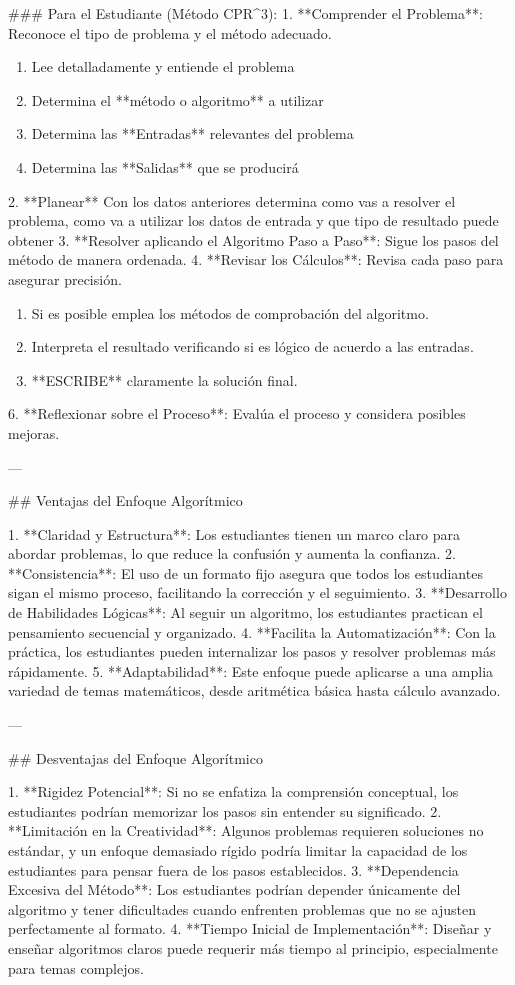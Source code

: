 \documentclass[12pt]{article}
\begin{document}
\begin{markdown}
### Para el Estudiante (Método CPR^3):
1. **Comprender el Problema**: Reconoce el tipo de problema y el método adecuado.
\begin{enumerate}
    \item Lee detalladamente y entiende el problema
    \item Determina el **método o algoritmo** a utilizar
    \item Determina las **Entradas** relevantes del problema
    \item Determina las **Salidas** que se producirá
\end{enumerate}
2. **Planear** Con los datos anteriores determina como vas a resolver el problema, como va a utilizar los datos de entrada y que tipo de resultado puede obtener
3. **Resolver aplicando el Algoritmo Paso a Paso**: Sigue los pasos del método de manera ordenada.
4. **Revisar los Cálculos**: Revisa cada paso para asegurar precisión. 
\begin{enumerate}
    \item Si es posible emplea los métodos de comprobación del algoritmo. 
    \item Interpreta el resultado verificando si es lógico de acuerdo a las entradas.
    \item **ESCRIBE** claramente la solución final.    
\end{enumerate}
6. **Reflexionar sobre el Proceso**: Evalúa el proceso y considera posibles mejoras.

---

## Ventajas del Enfoque Algorítmico

1. **Claridad y Estructura**: Los estudiantes tienen un marco claro para abordar problemas, lo que reduce la confusión y aumenta la confianza.
2. **Consistencia**: El uso de un formato fijo asegura que todos los estudiantes sigan el mismo proceso, facilitando la corrección y el seguimiento.
3. **Desarrollo de Habilidades Lógicas**: Al seguir un algoritmo, los estudiantes practican el pensamiento secuencial y organizado.
4. **Facilita la Automatización**: Con la práctica, los estudiantes pueden internalizar los pasos y resolver problemas más rápidamente.
5. **Adaptabilidad**: Este enfoque puede aplicarse a una amplia variedad de temas matemáticos, desde aritmética básica hasta cálculo avanzado.

---

## Desventajas del Enfoque Algorítmico

1. **Rigidez Potencial**: Si no se enfatiza la comprensión conceptual, los estudiantes podrían memorizar los pasos sin entender su significado.
2. **Limitación en la Creatividad**: Algunos problemas requieren soluciones no estándar, y un enfoque demasiado rígido podría limitar la capacidad de los estudiantes para pensar fuera de los pasos establecidos.
3. **Dependencia Excesiva del Método**: Los estudiantes podrían depender únicamente del algoritmo y tener dificultades cuando enfrenten problemas que no se ajusten perfectamente al formato.
4. **Tiempo Inicial de Implementación**: Diseñar y enseñar algoritmos claros puede requerir más tiempo al principio, especialmente para temas complejos.


\end{markdown}
\end{document}
